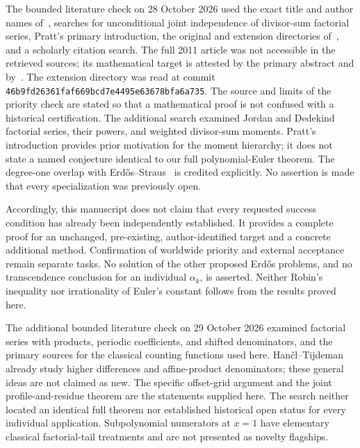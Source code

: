 The bounded literature check on 28 October 2026 used the exact title
and author names of~\cite{DS}, searches for unconditional joint
independence of divisor-sum factorial series, Pratt's primary
introduction, the original and extension directories of~\cite{TG},
and a scholarly citation search. The full 2011 article was not
accessible in the retrieved sources; its mathematical target is
attested by the primary abstract and by~\cite{Pratt}. The extension
directory was read at commit
\nolinkurl{46b9fd26361faf669bcd7e4495e63678bfa6a735}.
The source and limits of the priority check are stated so that a
mathematical proof is not confused with a historical certification.
The additional search examined Jordan and Dedekind factorial series,
their powers, and weighted divisor-sum moments. Pratt's introduction
provides prior motivation for the moment hierarchy; it does not state
a named conjecture identical to our full polynomial-Euler theorem.
The degree-one overlap with Erd\H{o}s--Straus~\cite{ES74} is credited
explicitly. No assertion is made that every specialization was
previously open.

Accordingly, this manuscript does not claim that every requested
success condition has already been independently established. It
provides a complete proof for an unchanged, pre-existing,
author-identified target and a concrete additional method. Confirmation
of worldwide priority and external acceptance remain separate tasks.
No solution of the other proposed Erd\H{o}s problems, and no
transcendence conclusion for an individual $\alpha_k$, is asserted.
Neither Robin's inequality nor irrationality of Euler's constant follows
from the results proved here.

The additional bounded literature check on 29 October 2026 examined
factorial series with products, periodic coefficients, and shifted
denominators, and the primary sources for the classical counting
functions used here. Han\v{c}l--Tijdeman~\cite{HT10} already study
higher differences and affine-product denominators; these general
ideas are not claimed as new. The specific offset-grid argument and
the joint profile-and-residue theorem are the statements supplied here.
The search neither located an identical full theorem nor established
historical open status for every individual application. Subpolynomial
numerators at $x=1$ have elementary classical factorial-tail treatments
and are not presented as novelty flagships.


